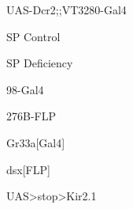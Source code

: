 \documentclass[17pt]{extarticle}
\begin{document}
\footnotesize
\vspace*{\fill}
\newpage{}
\vspace*{\fill}\begin{footnotesize}
UAS-Dcr2;;VT3280-Gal4 \\[0.5em]
\end{footnotesize}
\footnotesize
\vspace*{\fill}
\newpage{}
\vspace*{\fill}\begin{large}
SP Control \\[0.5em]
\end{large}
\footnotesize
\vspace*{\fill}
\newpage{}
\vspace*{\fill}\begin{normalsize}
SP Deficiency \\[0.5em]
\end{normalsize}
\footnotesize
\vspace*{\fill}
\newpage{}
\vspace*{\fill}\begin{large}
98-Gal4 \\[0.5em]
\end{large}
\footnotesize
\vspace*{\fill}
\newpage{}
\vspace*{\fill}\begin{large}
276B-FLP \\[0.5em]
\end{large}
\footnotesize
\vspace*{\fill}
\newpage{}
\vspace*{\fill}\begin{normalsize}
Gr33a[Gal4] \\[0.5em]
\end{normalsize}
\footnotesize
\vspace*{\fill}
\newpage{}
\vspace*{\fill}\begin{large}
dsx[FLP] \\[0.5em]
\end{large}
\footnotesize
\vspace*{\fill}
\newpage{}
\vspace*{\fill}\begin{normalsize}
UAS>stop>Kir2.1 \\[0.5em]
\end{normalsize}
\footnotesize
\vspace*{\fill}
\end{document}
